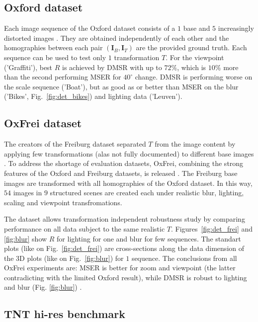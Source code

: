 \documentclass{article}
\def\I{{\mathbf I}}
\begin{document}
\subsection{Oxford dataset}
\label{ssec:oxford}
Each image sequence of the Oxford dataset consists of a $1$ base and $5$ increasingly distorted images \cite{Mikolajczyk:2005}. They are obtained independently of each other and the homographies between each pair $(\I_B,\I_T)$ are the provided  ground truth. Each sequence can be used to test only $1$ transformation $T$.
For the viewpoint ('Graffiti'), best $R$ is achieved by DMSR with up to $72\%$, which is $10\%$ more than the second performing MSER for $40^{\circ}$ change. DMSR is performing worse on the scale sequence ('Boat'), but as good as or better than MSER on the blur ('Bikes', Fig.~\ref{fig:det_bikes}) and lighting data ('Leuven').

\subsection{OxFrei dataset}
\label{ssec:combined}
The creators of the Freiburg dataset separated $T$ from the image content by applying few transformations (alas not fully documented) to different base images \cite{FischerDB14}. To address the shortage of evaluation datasets, OxFrei, combining the strong features of the Oxford and Freiburg datasets, is released \cite{elena_ranguelova_2016_45156}. The Freiburg base images are transformed with all homographies of the Oxford dataset. In this way, $54$ images in $9$ structured scenes are created each under realistic blur, lighting, scaling and viewpoint transfromations.

The dataset allows transformation independent robustness study by comparing performance on all data subject to the same realistic $T$. Figures~\ref{fig:det_frei} and \ref{fig:blur} show $R$ for lighting for one and blur for few sequences. The standart plots (like on Fig.~\ref{fig:det_frei}) are cross-sections along the data dimension of the 3D plots (like on Fig.~\ref{fig:blur}) for $1$ sequence. The conclusions from all OxFrei experiments are: MSER is better for zoom and viewpoint (the latter contradicting with the limited Oxford result), while DMSR is robust to lighting and blur (Fig. \ref{fig:blur}) \cite{elena_ranguelova_2016_45156}.

\subsection{TNT hi-res benchmark}
\label{ssec:tnt}
\end{document}
